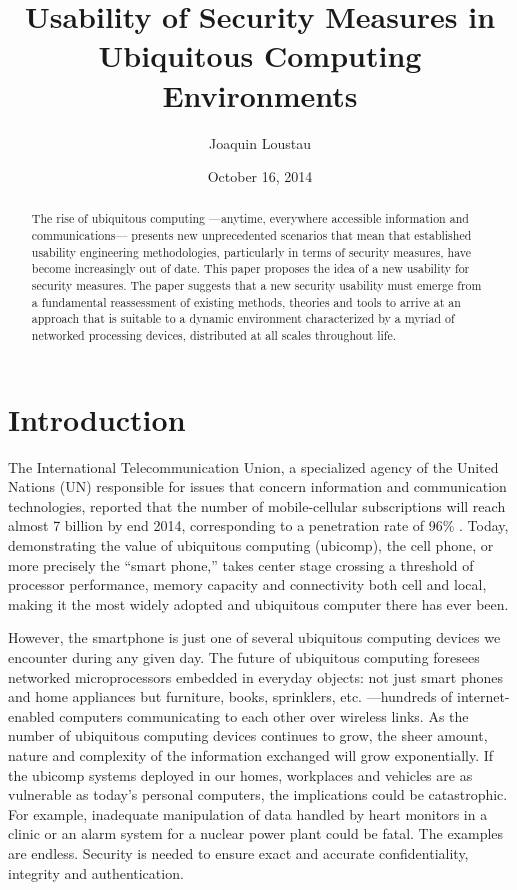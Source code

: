 \documentclass{article}
\title{Usability of Security Measures in Ubiquitous Computing Environments}
\author{Joaquin Loustau}
\date{October 16, 2014}
\begin{document}
\maketitle

\begin{abstract} %
The rise of ubiquitous computing ---anytime, everywhere accessible information and communications--- presents new unprecedented scenarios that mean that established usability engineering methodologies, particularly in terms of security measures, have become increasingly out of date. This paper proposes the idea of a new usability for security measures.  The paper suggests that a new security usability must emerge from a fundamental reassessment of existing methods, theories and tools to arrive at an approach that is suitable to a dynamic environment characterized by a myriad of networked processing devices, distributed at all scales throughout life. 
\end{abstract}

\pagebreak
\tableofcontents

\pagebreak

%
%
\section{Introduction}
\label{introduction}
The International Telecommunication Union, a specialized agency of the United Nations (UN) responsible for issues that concern information and communication technologies, reported that the number of mobile-cellular subscriptions will reach almost 7 billion by end 2014, corresponding to a penetration rate of 96\% \cite{itu2014world}. Today, demonstrating the value of ubiquitous computing (ubicomp), the cell phone, or more precisely the “smart phone,” takes center stage crossing a threshold of processor performance, memory capacity and connectivity both cell and local, making it the most widely adopted and ubiquitous computer there has ever been. 

However, the smartphone is just one of several ubiquitous computing devices we encounter during any given day. The future of ubiquitous computing foresees networked microprocessors embedded in everyday objects: not just smart phones and home appliances but furniture, books, sprinklers, etc. ---hundreds of internet-enabled computers communicating to each other over wireless links. 
As the number of ubiquitous computing devices continues to grow, the sheer amount, nature and complexity of the information exchanged will grow exponentially. If the ubicomp systems deployed in our homes, workplaces and vehicles are as vulnerable as today’s personal computers, the implications could be catastrophic. For example, inadequate manipulation of data handled by heart monitors in a clinic or an alarm system for a nuclear power plant could be fatal. The examples are endless. Security is needed to ensure exact and accurate confidentiality, integrity and authentication.
\end{document}
